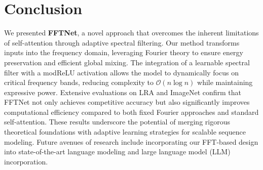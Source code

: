 \section{Conclusion}
We presented \textbf{FFTNet}, a novel approach that overcomes the inherent limitations of self-attention through adaptive spectral filtering. Our method transforms inputs into the frequency domain, leveraging Fourier theory to ensure energy preservation and efficient global mixing. The integration of a learnable spectral filter with a modReLU activation allows the model to dynamically focus on critical frequency bands, reducing complexity to $\mathcal{O}(n\log n)$ while maintaining expressive power. Extensive evaluations on LRA and ImageNet confirm that FFTNet not only achieves competitive accuracy but also significantly improves computational efficiency compared to both fixed Fourier approaches and standard self-attention. These results underscore the potential of merging rigorous theoretical foundations with adaptive learning strategies for scalable sequence modeling. Future avenues of research include incorporating our FFT-based design into state-of-the-art language modeling and large language model (LLM) incorporation.